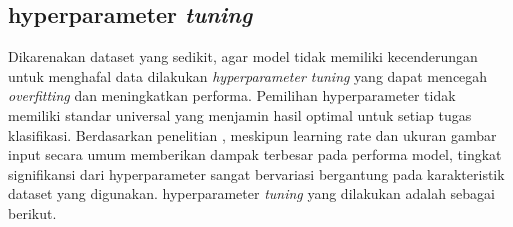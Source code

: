 \subsection{hyperparameter \textit{tuning}}
Dikarenakan dataset yang sedikit, agar model tidak memiliki kecenderungan untuk menghafal data dilakukan \textit{hyperparameter tuning} yang dapat mencegah \textit{overfitting} dan meningkatkan performa. Pemilihan hyperparameter tidak memiliki standar universal yang menjamin hasil optimal untuk setiap tugas klasifikasi. Berdasarkan penelitian \textcite{wojciuk2024improving}, meskipun learning rate dan ukuran gambar input secara umum memberikan dampak terbesar pada performa model, tingkat signifikansi dari hyperparameter sangat bervariasi bergantung pada karakteristik dataset yang digunakan. hyperparameter \textit{tuning} yang dilakukan adalah sebagai berikut.
